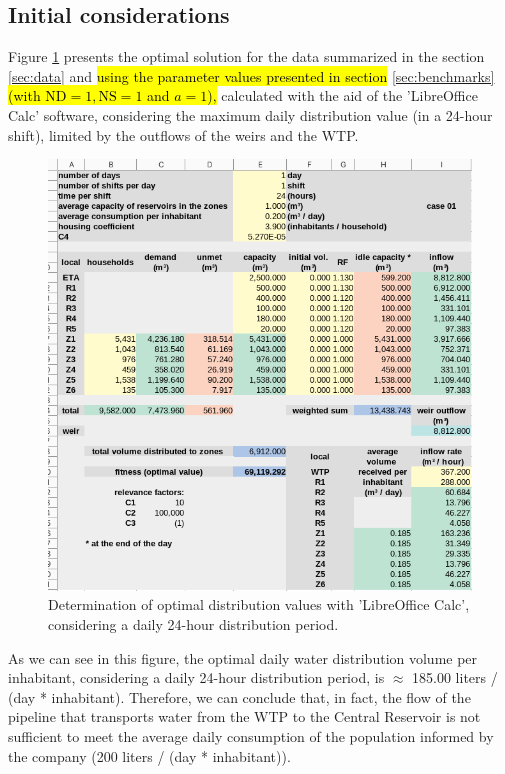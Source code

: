 \documentclass{singlecol}
\theoremstyle{TH}{
\newtheorem{lemma}{Lemma}
\newtheorem{theorem}[lemma]{Theorem}
\newtheorem{corrolary}[lemma]{Corrolary}
\newtheorem{conjecture}[lemma]{Conjecture}
\newtheorem{proposition}[lemma]{Proposition}
\newtheorem{claim}[lemma]{Claim}
\newtheorem{stheorem}[lemma]{Wrong Theorem}
\newtheorem{algorithm}{Algorithm}
}
\theoremstyle{THrm}{
\newtheorem{definition}{Definition}[section]
\newtheorem{question}{Question}[section]
\newtheorem{remark}{Remark}
\newtheorem{scheme}{Scheme}
}
\theoremstyle{THhit}{
\newtheorem{case}{Case}[section]
}
\begin{document}
\subsection{Initial considerations}
\label{sec:initialConsiderations}

Figure \ref{fig:evalOptimalValues} presents the optimal solution for the data summarized in the section \ref{sec:data} and \hl{using the parameter values presented in section} \ref{sec:benchmarks} \hl{(with $\mathrm{ND}=1, \mathrm{NS}=1$ and $a=1$),} calculated with the aid of the 'LibreOffice Calc' software, considering the maximum daily distribution value (in a 24-hour shift), limited by the outflows of the weirs and the WTP.

\begin{figure}[h!]
	\begin{center}
	    \caption{Determination of optimal distribution values with 'LibreOffice Calc', considering a daily 24-hour distribution period.}
		\label{fig:evalOptimalValues}
		\centering
		\includegraphics[width=\textwidth]{figures/case01Evaluation.png}
	\end{center}
\end{figure}

As we can see in this figure, the optimal daily water distribution volume per inhabitant, considering a daily 24-hour distribution period, is $\approx$ 185.00 liters / (day * inhabitant). Therefore, we can conclude that, in fact, the flow of the pipeline that transports water from the WTP to the Central Reservoir is not sufficient to meet the average daily consumption of the population informed by the company (200 liters / (day * inhabitant)).
\end{document}
